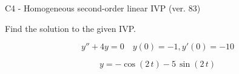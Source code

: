 \begin{exercise}
  \begin{exerciseTitle}C4 - Homogeneous second-order linear IVP (ver. 83)\end{exerciseTitle}
  \begin{exerciseStatement}
    
Find the solution to the given IVP.

    
\[y''+4y = 0 \hspace{1em} y(0) = -1 , y'(0) = -10\]

  \end{exerciseStatement}
  \begin{exerciseAnswer}
    
\[y= -\cos\left(2 \, t\right) - 5 \, \sin\left(2 \, t\right)\]

  \end{exerciseAnswer}
\end{exercise}
